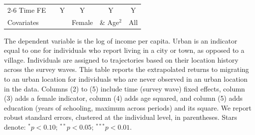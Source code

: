\begin{table}[htbp]
\begin{threeparttable}
\begin{tabular}{l ccccc}
\cmidrule{2-6} Time FE & & Y & Y & Y & Y \\ Covariates & & & Female & \& Age$^2$ & All \\ \bottomrule \end{tabular} \begin{tablenotes}[flushleft] \footnotesize \item{The dependent variable is the log of income per capita. Urban is an indicator equal to one for individuals who report living in a city or town, as opposed to a village. Individuals are assigned to trajectories based on their location history across the survey waves. This table reports the extrapolated returns to migrating to an urban location for individuals who are never observed in an urban location in the data. Columns (2) to (5) include time (survey wave) fixed effects, column (3) adds a female indicator, column (4) adds age squared, and column (5) adds education (years of schooling, maximum across periods) and its square. We report robust standard errors, clustered at the individual level, in parentheses. Stars denote: $^{*} p<0.10$; $^{**} p<0.05$; $^{***} p<0.01$.} \end{tablenotes} \end{threeparttable} \end{table}
